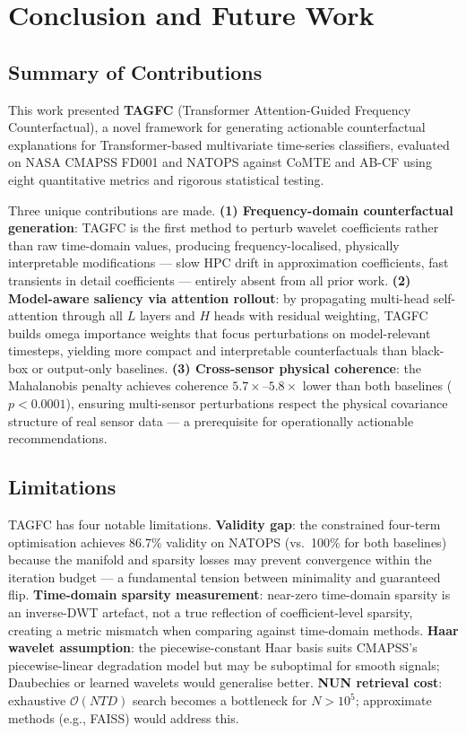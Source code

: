 \chapter{Conclusion and Future Work}

\section{Summary of Contributions}

This work presented \textbf{TAGFC} (Transformer Attention-Guided Frequency Counterfactual), a novel framework for generating actionable counterfactual explanations for Transformer-based multivariate time-series classifiers, evaluated on NASA CMAPSS FD001 and NATOPS against CoMTE and AB-CF using eight quantitative metrics and rigorous statistical testing.

Three unique contributions are made. \textbf{(1) Frequency-domain counterfactual generation}: TAGFC is the first method to perturb wavelet coefficients rather than raw time-domain values, producing frequency-localised, physically interpretable modifications — slow HPC drift in approximation coefficients, fast transients in detail coefficients — entirely absent from all prior work. \textbf{(2) Model-aware saliency via attention rollout}: by propagating multi-head self-attention through all $L$ layers and $H$ heads with residual weighting, TAGFC builds omega importance weights that focus perturbations on model-relevant timesteps, yielding more compact and interpretable counterfactuals than black-box or output-only baselines. \textbf{(3) Cross-sensor physical coherence}: the Mahalanobis penalty achieves coherence $5.7\times$--$5.8\times$ lower than both baselines ($p < 0.0001$), ensuring multi-sensor perturbations respect the physical covariance structure of real sensor data — a prerequisite for operationally actionable recommendations.

\section{Limitations}

TAGFC has four notable limitations. \textbf{Validity gap}: the constrained four-term optimisation achieves 86.7\% validity on NATOPS (vs.\ 100\% for both baselines) because the manifold and sparsity losses may prevent convergence within the iteration budget — a fundamental tension between minimality and guaranteed flip. \textbf{Time-domain sparsity measurement}: near-zero time-domain sparsity is an inverse-DWT artefact, not a true reflection of coefficient-level sparsity, creating a metric mismatch when comparing against time-domain methods. \textbf{Haar wavelet assumption}: the piecewise-constant Haar basis suits CMAPSS's piecewise-linear degradation model but may be suboptimal for smooth signals; Daubechies or learned wavelets would generalise better. \textbf{NUN retrieval cost}: exhaustive $\mathcal{O}(NTD)$ search becomes a bottleneck for $N > 10^5$; approximate methods (e.g., FAISS) would address this.

